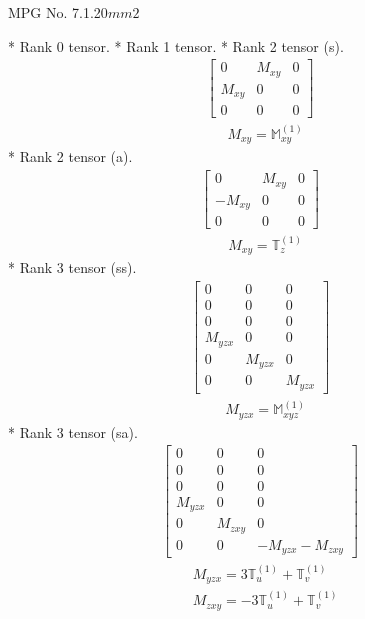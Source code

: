 \documentclass[fleqn,8pt,landscape]{jsarticle}
\begin{document}
\setcounter{MaxMatrixCols}{32}

\renewcommand{\tablename}{Table~}
\renewcommand{\figurename}{Figure~}
\begin{center}
\LARGE
MPG No. 7.1.20\quad$mm2$
\end{center}
* Rank 0 tensor.
* Rank 1 tensor.
* Rank 2 tensor (s).
\begin{align*}
\begin{bmatrix} 0 & M_{xy} & 0 \\ M_{xy} & 0 & 0 \\ 0 & 0 & 0 \end{bmatrix}
\end{align*}
\begin{align*}
& M_{xy} = \mathbb{M}_{xy}^{(1)}
\end{align*}
* Rank 2 tensor (a).
\begin{align*}
\begin{bmatrix} 0 & M_{xy} & 0 \\ - M_{xy} & 0 & 0 \\ 0 & 0 & 0 \end{bmatrix}
\end{align*}
\begin{align*}
& M_{xy} = \mathbb{T}_{z}^{(1)}
\end{align*}
* Rank 3 tensor (ss).
\begin{align*}
\begin{bmatrix} 0 & 0 & 0 \\ 0 & 0 & 0 \\ 0 & 0 & 0 \\ M_{yzx} & 0 & 0 \\ 0 & M_{yzx} & 0 \\ 0 & 0 & M_{yzx} \end{bmatrix}
\end{align*}
\begin{align*}
& M_{yzx} = \mathbb{M}_{xyz}^{(1)}
\end{align*}
* Rank 3 tensor (sa).
\begin{align*}
\begin{bmatrix} 0 & 0 & 0 \\ 0 & 0 & 0 \\ 0 & 0 & 0 \\ M_{yzx} & 0 & 0 \\ 0 & M_{zxy} & 0 \\ 0 & 0 & - M_{yzx} - M_{zxy} \end{bmatrix}
\end{align*}
\begin{align*}
& M_{yzx} = 3 \mathbb{T}_{u}^{(1)} + \mathbb{T}_{v}^{(1)} \\
& M_{zxy} = - 3 \mathbb{T}_{u}^{(1)} + \mathbb{T}_{v}^{(1)}
\end{align*}
\end{document}
